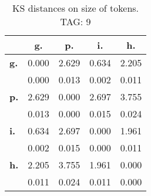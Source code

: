 \begin{table}[h!]
\begin{center}
\begin{tabular}{| l || c | c | c | c |}\hline
 & {\bf g.} & {\bf p.} & {\bf i.} & {\bf h.} \\\hline\hline
{\bf g.} & 0.000 & 2.629 & 0.634 & 2.205 \\
{\bf } & 0.000 & 0.013 & 0.002 & 0.011 \\\hline
{\bf p.} & 2.629 & 0.000 & 2.697 & 3.755 \\
{\bf } & 0.013 & 0.000 & 0.015 & 0.024 \\\hline
{\bf i.} & 0.634 & 2.697 & 0.000 & 1.961 \\
{\bf } & 0.002 & 0.015 & 0.000 & 0.011 \\\hline
{\bf h.} & 2.205 & 3.755 & 1.961 & 0.000 \\
{\bf } & 0.011 & 0.024 & 0.011 & 0.000 \\\hline
\end{tabular}
\caption{KS distances on size of tokens. TAG: 9}
\end{center}
\end{table}